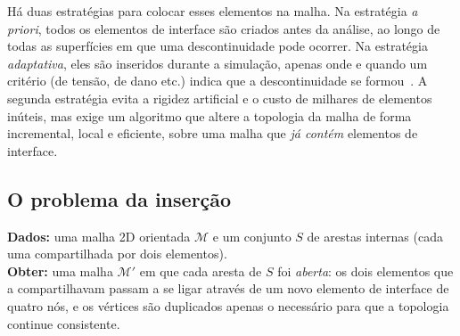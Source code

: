 Há duas estratégias para colocar esses elementos na malha. Na estratégia \emph{a priori}, todos os elementos de
interface são criados antes da análise, ao longo de todas as superfícies em que uma descontinuidade pode ocorrer. Na
estratégia \emph{adaptativa}, eles são inseridos durante a simulação, apenas onde e quando um critério (de tensão, de
dano etc.) indica que a descontinuidade se formou~\cite{paulino}. A segunda estratégia evita a rigidez artificial e o
custo de milhares de elementos inúteis, mas exige um algoritmo que altere a topologia da malha de forma incremental,
local e eficiente, sobre uma malha que \emph{já contém} elementos de interface.

\subsection{O problema da inserção}
\label{sec:problema}

\begin{nota}[Problema]
\textbf{Dados:} uma malha 2D orientada $\mathcal{M}$ e um conjunto $S$ de arestas internas (cada uma compartilhada por
dois elementos).\\
\textbf{Obter:} uma malha $\mathcal{M}'$ em que cada aresta de $S$ foi \emph{aberta}: os dois elementos que a
compartilhavam passam a se ligar através de um novo elemento de interface de quatro nós, e os vértices são duplicados
apenas o necessário para que a topologia continue consistente.
\end{nota}

